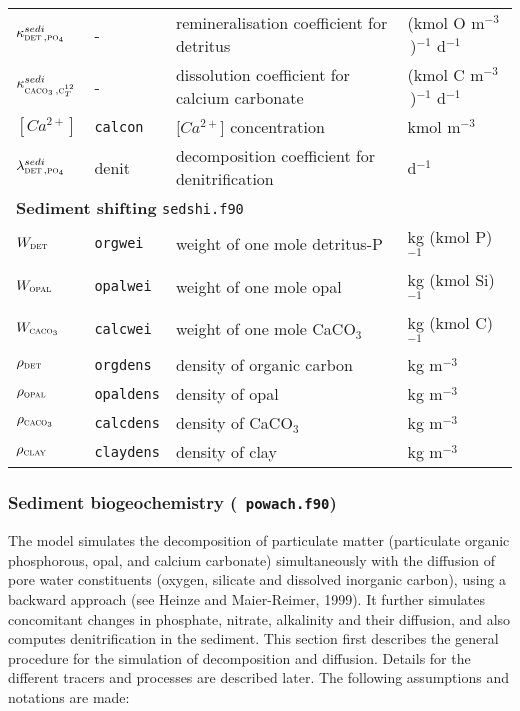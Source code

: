 \documentclass[11pt,a4paper,fleqn,twoside]{article}
\def\pho{\text{\textsc{po$_4$}}\,}
\def\car{\text{\textsc{c$_T^{12}$}}\,}
\def\det{\text{\textsc{det}}\,}
\def\opal{\text{\textsc{opal}}\,}
\def\cal{\text{\textsc{caco$_3$}}\,}
\def\clay{\text{\textsc{clay}}\,}
\newcommand{\concC}{kmol C m$^{-3}$\,}
\newcommand{\concO}{kmol O m$^{-3}$\,}
\begin{document}
\begin{table}[htb]
\begin{center}
\begin{tabular}{llp{5cm}l}
$\kappa^{sedi}_{\det,\pho}$& - &remineralisation coefficient for detritus&(\concO)$^{-1}$ d$^{-1}$\\
$\kappa^{sedi}_{\cal,\car}$& - &dissolution coefficient for calcium carbonate&(\concC)$^{-1}$ d$^{-1}$\\
$[Ca^{2+}]$&{\tt calcon}& [$Ca^{2+}$] concentration & kmol m$^{-3}$\\
$\lambda^{sedi}_{\det,\pho}$& denit &decomposition coefficient for denitrification& d$^{-1}$\\
\multicolumn{4}{l}{\rule{0mm}{4mm}{\bf Sediment shifting} {\tt sedshi.f90}}\\ \hline
$W_{\det}$ & {\tt orgwei} & weight of one mole detritus-P & kg (kmol P)$^{-1}$ \\ 
$W_{\opal}$ & {\tt opalwei} & weight of one mole opal & kg (kmol Si)$^{-1}$  \\ 
$W_{\cal}$ & {\tt calcwei} & weight of one mole CaCO$_3$ & kg (kmol C)$^{-1}$  \\ 
$\rho_{\det}$ & {\tt orgdens} & density of organic carbon & kg m$^{-3}$ \\
$\rho_{\opal}$ & {\tt opaldens} & density of opal & kg m$^{-3}$ \\
$\rho_{\cal}$ & {\tt calcdens} & density of CaCO$_3$  & kg m$^{-3}$ \\
$\rho_{\clay}$ & {\tt claydens} & density of clay & kg m$^{-3}$ \\ \hline
\end{tabular}
\end{center}
\renewcommand{\baselinestretch}{1.5}
\normalsize
\end{table}


\subsubsection{\label{sediment_biogeochemistry}Sediment biogeochemistry ({\tt
powach.f90})}

The model simulates the decomposition of particulate matter (particulate
organic phosphorous, opal, and calcium carbonate) simultaneously with the diffusion
of pore water constituents (oxygen, silicate and dissolved inorganic carbon),
using a backward approach (see Heinze and Maier-Reimer, 1999). It further
simulates concomitant changes in phosphate, nitrate, alkalinity and their
diffusion, and also computes denitrification in the sediment. This section
first describes the general procedure for the simulation of decomposition and
diffusion. Details for the different tracers and processes are
described later. The following assumptions and notations are made:
\end{document}
